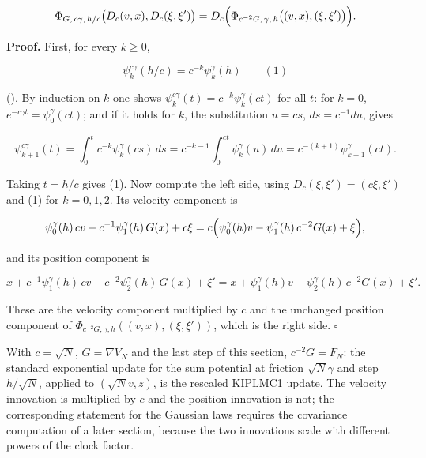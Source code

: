 \documentclass[11pt,a4paper]{report}
\begin{document}
\[\Phi_{G,\,c\gamma,\,h/c}\bigl(D_c(v,x),D_c(\xi,\xi')\bigr)=D_c\Bigl(\Phi_{c^{-2}G,\,\gamma,\,h}\bigl((v,x),(\xi,\xi')\bigr)\Bigr).\]


\textbf{Proof.} First, for every \(k\ge0\),


\[\psi^{c\gamma}_k(h/c)=c^{-k}\psi^\gamma_k(h)\qquad(1)\]


(\cite[Section~3.10.3]{LangevinLean2026Kinetic}). By induction on \(k\) one shows \(\psi^{c\gamma}_k(t)=c^{-k}\psi^\gamma_k(ct)\) for all \(t\): for \(k=0\), \(e^{-c\gamma t}=\psi^\gamma_0(ct)\); and if it holds for \(k\), the substitution \(u=cs\), \(ds=c^{-1}du\), gives


\[\psi^{c\gamma}_{k+1}(t)=\int_0^tc^{-k}\psi^\gamma_k(cs)\,ds=c^{-k-1}\int_0^{ct}\psi^\gamma_k(u)\,du=c^{-(k+1)}\psi^\gamma_{k+1}(ct).\]


Taking \(t=h/c\) gives (1). Now compute the left side, using \(D_c(\xi,\xi')=(c\xi,\xi')\) and (1) for \(k=0,1,2\). Its velocity component is


\[\psi^\gamma_0(h)\,cv-c^{-1}\psi^\gamma_1(h)\,G(x)+c\xi=c\Bigl(\psi^\gamma_0(h)v-\psi^\gamma_1(h)\,c^{-2}G(x)+\xi\Bigr),\]


and its position component is


\[x+c^{-1}\psi^\gamma_1(h)\,cv-c^{-2}\psi^\gamma_2(h)\,G(x)+\xi'=x+\psi^\gamma_1(h)v-\psi^\gamma_2(h)\,c^{-2}G(x)+\xi'.\]


These are the velocity component multiplied by \(c\) and the unchanged position component of \(\Phi_{c^{-2}G,\gamma,h}((v,x),(\xi,\xi'))\), which is the right side. \(\square\)




With \(c=\sqrt N\), \(G=\nabla V_N\) and the last step of this section, \(c^{-2}G=F_N\): the standard exponential update for the sum potential at friction \(\sqrt N\gamma\) and step \(h/\sqrt N\), applied to \((\sqrt Nv,z)\), is the rescaled KIPLMC1 update. The velocity innovation is multiplied by \(c\) and the position innovation is not; the corresponding statement for the Gaussian laws requires the covariance computation of a later section, because the two innovations scale with different powers of the clock factor.
\end{document}
